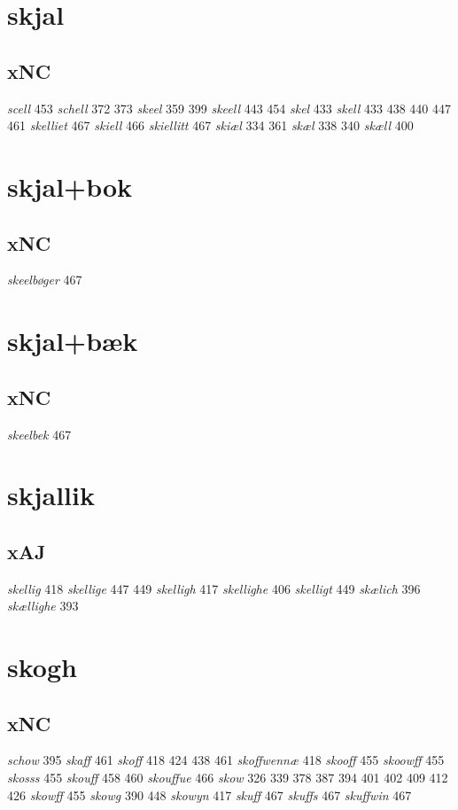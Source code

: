 \documentclass[a4paper,twocolumn]{article}
\begin{document}
\section{skjal}
\label{sec:orgc7dda30}
\subsection{xNC}
\label{sec:orgcd1e662}
\emph{scell} 453 \emph{schell} 372 373 \emph{skeel} 359 399 \emph{skeell} 443 454 \emph{skel} 433 \emph{skell} 433 438 440 447 461 \emph{skelliet} 467 \emph{skiell} 466 \emph{skiellitt} 467 \emph{skiæl} 334 361 \emph{skæl} 338 340 \emph{skæll} 400 
\section{skjal+bok}
\label{sec:org06917ed}
\subsection{xNC}
\label{sec:org0c93409}
\emph{skeelbøger} 467 
\section{skjal+bæk}
\label{sec:org0aadd7a}
\subsection{xNC}
\label{sec:orga0b0efc}
\emph{skeelbek} 467 
\section{skjallik}
\label{sec:orge946613}
\subsection{xAJ}
\label{sec:orgd71bb08}
\emph{skellig} 418 \emph{skellige} 447 449 \emph{skelligh} 417 \emph{skellighe} 406 \emph{skelligt} 449 \emph{skælich} 396 \emph{skællighe} 393 
\section{skogh}
\label{sec:orge220a58}
\subsection{xNC}
\label{sec:org921cc81}
\emph{schow} 395 \emph{skaff} 461 \emph{skoff} 418 424 438 461 \emph{skoffwennæ} 418 \emph{skooff} 455 \emph{skoowff} 455 \emph{skosss} 455 \emph{skouff} 458 460 \emph{skouffue} 466 \emph{skow} 326 339 378 387 394 401 402 409 412 426 \emph{skowff} 455 \emph{skowg} 390 448 \emph{skowyn} 417 \emph{skuff} 467 \emph{skuffs} 467 \emph{skuffwin} 467 
\end{document}
